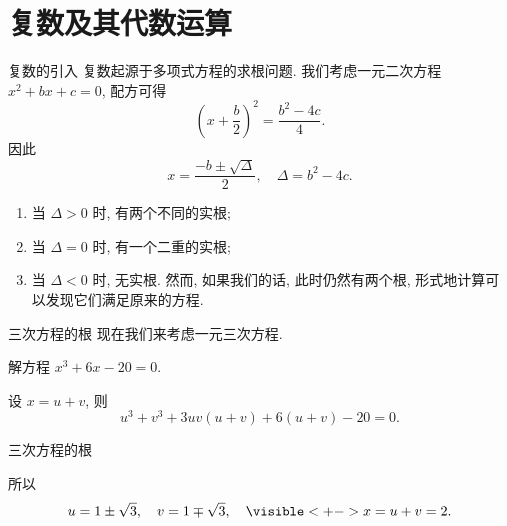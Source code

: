 \section{复数及其代数运算}


\begin{frame}{复数的引入}
\onslide<+->复数起源于多项式方程的求根问题.
\onslide<+->我们考虑一元二次方程 $x^2+bx+c=0$,
\onslide<+->配方可得
	\[\left(x+\frac b2\right)^2=\frac{b^2-4c}4.\]
\onslide<+->因此
	\[x=\frac{-b\pm\sqrt\Delta}2,\quad \Delta=b^2-4c.\]
	\vspace{-\baselineskip}
\begin{enumerate}
\item 当 $\Delta>0$ 时, 有两个不同的实根;
\item 当 $\Delta=0$ 时, 有一个二重的实根;
\item 当 $\Delta<0$ 时, 无实根.
\onslide<+->然而, 如果我们的话, 此时仍然有两个根, 形式地计算可以发现它们满足原来的方程.
\end{enumerate}
\end{frame}


\begin{frame}{三次方程的根}
\onslide<+->现在我们来考虑一元三次方程.
\onslide<+->
\begin{example}
解方程 $x^3+6x-20=0$.
\end{example}
\onslide<+->
\begin{solution}
设 $x=u+v$, 则
	\[u^3+v^3+3uv(u+v)+6(u+v)-20=0.\]
\visible<+->{我们希望
	\[u^3+v^3=20,\quad uv=-2,\]}
\visible<+->{解得
	\[u^3=10\pm\sqrt{108}\visible<+->{=(1\pm\sqrt3)^3.}\]}
\vspace{-\baselineskip}
\end{solution}
\end{frame}


\begin{frame}{三次方程的根}
\onslide<+->
\begin{solutionc}
\indent 所以 \[u=1\pm\sqrt3,\quad v=1\mp\sqrt 3,\quad
	\visible<+->{x=u+v=2.}\]
\vspace{-\baselineskip}
\end{solutionc}
\end{frame}


